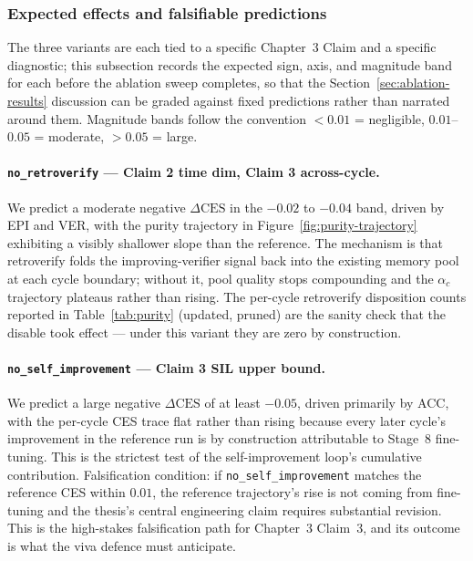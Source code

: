 \subsubsection*{Expected effects and falsifiable predictions}

The three variants are each tied to a specific Chapter~3 Claim and a specific diagnostic; this subsection records the expected sign, axis, and magnitude band for each before the ablation sweep completes, so that the Section~\ref{sec:ablation-results} discussion can be graded against fixed predictions rather than narrated around them. Magnitude bands follow the convention $<0.01$ = negligible, $0.01$--$0.05$ = moderate, $>0.05$ = large.

\paragraph{\texttt{no\_retroverify} --- Claim 2 time dim, Claim 3 across-cycle.}
We predict a moderate negative $\Delta\text{CES}$ in the $-0.02$ to $-0.04$ band, driven by EPI and VER, with the purity trajectory in Figure~\ref{fig:purity-trajectory} exhibiting a visibly shallower slope than the reference. The mechanism is that retroverify folds the improving-verifier signal back into the existing memory pool at each cycle boundary; without it, pool quality stops compounding and the $\alpha_{c}$ trajectory plateaus rather than rising. The per-cycle retroverify disposition counts reported in Table~\ref{tab:purity} (updated, pruned) are the sanity check that the disable took effect --- under this variant they are zero by construction.

\paragraph{\texttt{no\_self\_improvement} --- Claim 3 SIL upper bound.}
We predict a large negative $\Delta\text{CES}$ of at least $-0.05$, driven primarily by ACC, with the per-cycle CES trace flat rather than rising because every later cycle's improvement in the reference run is by construction attributable to Stage~8 fine-tuning. This is the strictest test of the self-improvement loop's cumulative contribution. Falsification condition: if \texttt{no\_self\_improvement} matches the reference CES within $0.01$, the reference trajectory's rise is not coming from fine-tuning and the thesis's central engineering claim requires substantial revision. This is the high-stakes falsification path for Chapter~3 Claim~3, and its outcome is what the viva defence must anticipate.


